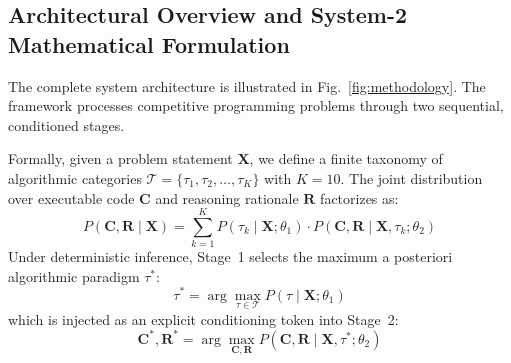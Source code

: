 \documentclass{ieeeaccess}
\begin{document}
\subsection{Architectural Overview and System-2 Mathematical Formulation}
The complete system architecture is illustrated in Fig.~\ref{fig:methodology}. The framework processes competitive programming problems through two sequential, conditioned stages. 

Formally, given a problem statement $\mathbf{X}$, we define a finite taxonomy of algorithmic categories $\mathcal{T} = \{\tau_1, \tau_2, \dots, \tau_K\}$ with $K=10$. The joint distribution over executable code $\mathbf{C}$ and reasoning rationale $\mathbf{R}$ factorizes as:
\begin{equation}
\label{eq:factored_joint}
P(\mathbf{C}, \mathbf{R} \mid \mathbf{X}) = \sum_{k=1}^K P(\tau_k \mid \mathbf{X}; \theta_1) \cdot P(\mathbf{C}, \mathbf{R} \mid \mathbf{X}, \tau_k; \theta_2)
\end{equation}
Under deterministic inference, Stage~1 selects the maximum a posteriori algorithmic paradigm $\tau^*$:
\begin{equation}
\tau^* = \arg\max_{\tau \in \mathcal{T}} P(\tau \mid \mathbf{X}; \theta_1)
\end{equation}
which is injected as an explicit conditioning token into Stage~2:
\begin{equation}
\mathbf{C}^*, \mathbf{R}^* = \arg\max_{\mathbf{C}, \mathbf{R}} P(\mathbf{C}, \mathbf{R} \mid \mathbf{X}, \tau^*; \theta_2)
\end{equation}
\end{document}
